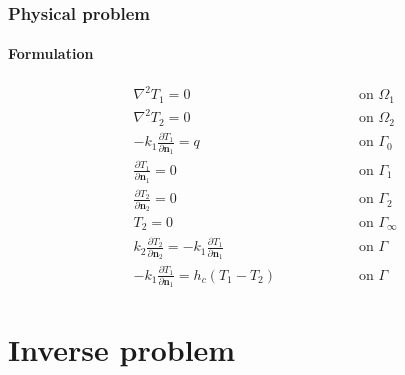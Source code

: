 \documentclass{beamer}
\begin{document}
%
\begin{frame}
	\frametitle{Physical problem}
	\framesubtitle{Formulation}
	\begin{subequations}
		\begin{alignat*}{2}
		& \nabla^2 T_1 = 0 \quad\quad\quad\quad && \text{ on } \Omega_1  \\ 
		& \nabla^2 T_2 = 0 && \text{ on }  \Omega_2\\ 
		& -k_1 \frac{\partial T_1}{\partial\mathbf{n}_1} = q && \text{ on } \Gamma_0   \\ 
		& \frac{\partial T_1}{\partial \mathbf{n}_1} = 0 && \text{ on }  \Gamma_1 \\ 
		& \frac{\partial T_2}{\partial \mathbf{n}_2} = 0 && \text{ on }  \Gamma_2 \\
		& T_2 = 0 && \text{ on }  \Gamma_\infty  \\ 
		& k_2\frac{\partial T_2}{\partial\mathbf{n}_2} = - k_1\frac{\partial T_1}{\partial\mathbf{n}_1} && \text{ on }  \Gamma \\
		& -k_1 \frac{\partial T_1}{\partial\mathbf{n}_1} = h_c(T_1-T_2) \quad\quad\quad\quad && \text{ on }  \Gamma
		\end{alignat*}
	\end{subequations}
\end{frame}
%
\section{Inverse problem}
\end{document}
